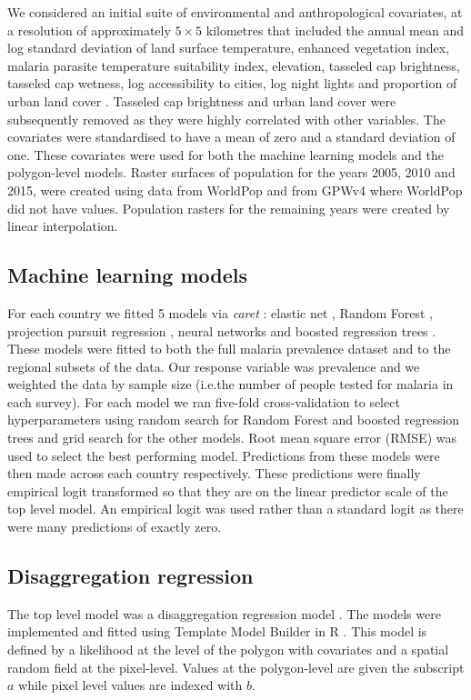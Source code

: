 \documentclass[review]{elsarticle}
\begin{document}
We considered an initial suite of environmental and anthropological covariates, at a resolution of approximately $5 \times 5$ kilometres that included the annual mean and log standard deviation of land surface temperature, enhanced vegetation index, malaria parasite temperature suitability index, elevation, tasseled cap brightness, tasseled cap wetness, log accessibility to cities, log night lights and proportion of urban land cover \citep{weiss2015re, weiss2018global}. 
Tasseled cap brightness and urban land cover were subsequently removed as they were highly correlated with other variables. 
The covariates were standardised to have a mean of zero and a standard deviation of one. 
These covariates were used for both the machine learning models and the polygon-level models.
Raster surfaces of population for the years 2005, 2010 and 2015, were created using data from WorldPop \citep{tatem2017worldpop} and from GPWv4 \citep{gpw4} where WorldPop did not have values. 
Population rasters for the remaining years were created by linear interpolation. 


\subsection{Machine learning models}
For each country we fitted 5 models via \emph{caret} \citep{caret}: elastic net \citep{enet}, Random Forest \citep{wright2015ranger}, projection pursuit regression \citep{friedman1981projection}, neural networks \citep{nnet} and boosted regression trees \citep{gbm}.
These models were fitted to both the full malaria prevalence dataset and to the regional subsets of the data.
Our response variable was prevalence and we weighted the data by sample size (i.e.\thinspace the number of people tested for malaria in each survey).
For each model we ran  five-fold cross-validation to select hyperparameters using random search for Random Forest and boosted regression trees and grid search for the other models. 
Root mean square error (RMSE) was used to select the best performing model.
Predictions from these models were then made across each country respectively.
These predictions were finally empirical logit transformed so that they are on the linear predictor scale of the top level model.
An empirical logit was used rather than a standard logit as there were many predictions of exactly zero.

\subsection{Disaggregation regression}
The top level model was a disaggregation regression model \citep{sturrock2014fine, wilson2017pointless, law2018variational, taylor2017continuous, li2012log}.
The models were implemented and fitted using Template Model Builder \citep{TMB} in R \citep{R}.
This model is defined by a likelihood at the level of the polygon with covariates and a spatial random field at the pixel-level. 
Values at the polygon-level are given the subscript $a$ while pixel level values are indexed with $b$.
\end{document}
